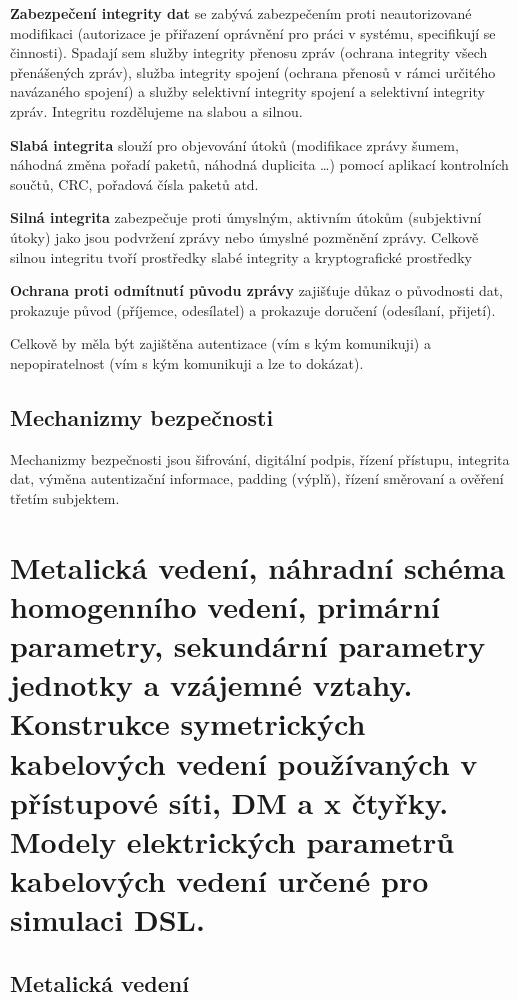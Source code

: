 \textbf{Zabezpečení integrity dat} se zabývá zabezpečením proti neautorizované modifikaci (autorizace je přiřazení oprávnění pro práci v systému, specifikují se činnosti).
Spadají sem služby integrity přenosu zpráv (ochrana integrity všech přenášených zpráv), služba integrity spojení (ochrana přenosů v rámci určitého navázaného spojení) a služby selektivní integrity spojení a selektivní integrity zpráv.
Integritu rozdělujeme na slabou a silnou.

\noindent \textbf{Slabá integrita} slouží pro objevování útoků (modifikace zprávy šumem, náhodná změna pořadí paketů, náhodná duplicita \dots) pomocí aplikací kontrolních součtů, CRC, pořadová čísla paketů atd.

\noindent \textbf{Silná integrita} zabezpečuje proti úmyslným, aktivním útokům (subjektivní útoky) jako jsou podvržení zprávy nebo úmyslné pozměnění zprávy.
Celkově silnou integritu tvoří prostředky slabé integrity a kryptografické prostředky


\textbf{Ochrana proti odmítnutí původu zprávy} zajišťuje důkaz o původnosti dat, prokazuje původ (příjemce, odesílatel) a prokazuje doručení (odesílaní, přijetí).

\vspace{0,5cm}
Celkově by měla být zajištěna autentizace (vím s kým komunikuji) a nepopiratelnost (vím s kým komunikuji a lze to dokázat).

\subsection{Mechanizmy bezpečnosti}

Mechanizmy bezpečnosti jsou šifrování, digitální podpis, řízení přístupu, integrita dat, výměna autentizační informace, padding (výplň), řízení směrovaní a ověření třetím subjektem.


\clearpage
\section{Metalická vedení, náhradní schéma homogenního vedení, primární parametry, sekundární parametry jednotky a vzájemné vztahy. Konstrukce symetrických kabelových vedení používaných v přístupové síti, DM a x čtyřky. Modely elektrických parametrů kabelových vedení určené pro simulaci DSL.}

\subsection{Metalická vedení}

